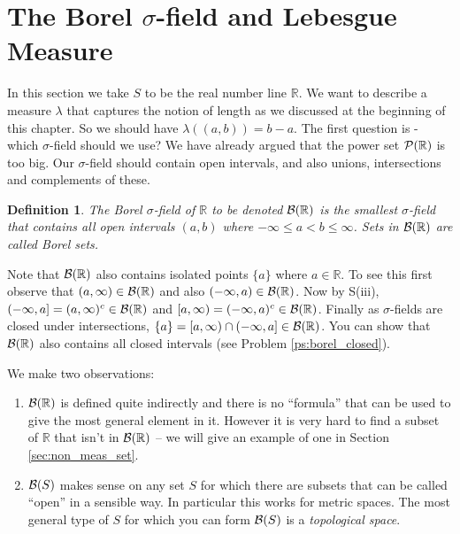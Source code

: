 \documentclass[a4paper]{report}
\newcounter{thm_counter}[chapter]
\newtheorem{defn}[thm_counter]{Definition}
\numberwithin{equation}{chapter}
\numberwithin{thm_counter}{section}
\def\mb{\mathbb} %
\def\R{\mb{R}} %
\begin{document}
\newpage
\section{The Borel \(\sigma\)-field and Lebesgue Measure}
\label{sec:borel_field_leb_meas}

In this section we take $S$ to be the real number line $\R$. We want to describe a measure $\lambda$ that captures the notion of length as we discussed at the beginning of this chapter. So we should have $\lambda((a,b)) = b-a$. The first question is - which $\sigma$-field should we use? We have already argued that the power set ${\cal P}(\R)$ is too big. Our $\sigma$-field should contain open intervals, and also unions, intersections and complements of these.

 

\begin{defn}
 The {\it Borel $\sigma$-field} of $\R$ to be denoted ${\cal B}(\R)$ is the smallest $\sigma$-field that contains all open intervals $(a, b)$ where $-\infty \leq a < b \leq \infty$. Sets in ${\cal B}(\R)$ are called {\it Borel sets}.
\end{defn}

 

Note that ${\cal B}(\R)$ also contains isolated points $\{a\}$ where $a \in \R$. To see this first observe that $(a, \infty) \in {\cal B}(\R)$ and also $(-\infty, a) \in {\cal B}(\R)$. Now by S(iii),$(-\infty, a] = (a, \infty)^{c} \in {\cal B}(\R)$ and  $[a, \infty) = (-\infty, a)^{c} \in {\cal B}(\R)$. Finally as $\sigma$-fields are closed under intersections, $\{a\} = [a, \infty) \cap (-\infty, a] \in {\cal B}(\R)$. You can show that ${\cal B}(\R)$ also contains all closed intervals (see Problem \ref{ps:borel_closed}).

 

We make two observations:
\begin{enumerate} \item ${\cal B}(\R)$ is defined quite indirectly and there is no ``formula'' that can be used to give the most general element in it. However it is very hard to find a subset of $\R$  that isn't in ${\cal B}(\R)$ -- we will give an example of one in Section \ref{sec:non_meas_set}.

\item ${\cal B}(S)$ makes sense on any set $S$ for which there are subsets that can be called ``open'' in a sensible way. In particular this works for metric spaces. The most general type of $S$ for which you can form ${\cal B}(S)$ is a {\it topological space}.

\end{enumerate}
\end{document}
